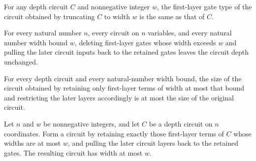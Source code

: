 \begin{theorem}
\label{FABL.DepthCircuit.layer1Gate_truncateWidth}
\leanok
{}
For any depth circuit $C$ and nonnegative integer $w$, the first-layer gate type of the
circuit obtained by truncating $C$ to width $w$ is the same as that of $C$.
\end{theorem}

\begin{theorem}
\label{FABL.DepthCircuit.depth_truncateWidth}
\leanok
{}
For every natural number $n$, every circuit on $n$ variables, and every natural number
width bound $w$, deleting first-layer gates whose width exceeds $w$ and pulling the
later circuit inputs back to the retained gates leaves the circuit depth unchanged.
\end{theorem}

\begin{theorem}
\label{FABL.DepthCircuit.size_truncateWidth_le}
\leanok
{}
For every depth circuit and every natural-number width bound, the size of the circuit
obtained by retaining only first-layer terms of width at most that bound and restricting
the later layers accordingly is at most the size of the original circuit.
\end{theorem}

\begin{theorem}
\label{FABL.DepthCircuit.width_truncateWidth_le}
\leanok
{}
Let $n$ and $w$ be nonnegative integers, and let $C$ be a depth circuit on $n$
coordinates. Form a circuit by retaining exactly those first-layer terms of $C$ whose
widths are at most $w$, and pulling the later circuit layers back to the retained gates.
The resulting circuit has width at most $w$.
\end{theorem}

